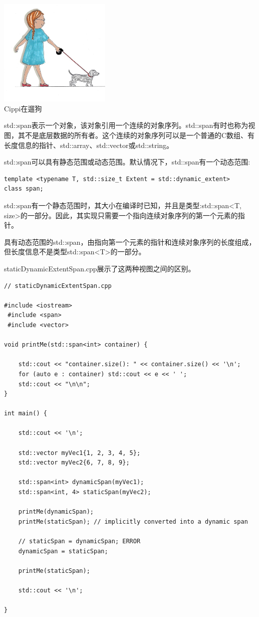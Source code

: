 \begin{center}
\includegraphics[width=0.4\textwidth]{content/3/chapter5/images/3.png}\\
Cippi在遛狗
\end{center}

std::span表示一个对象，该对象引用一个连续的对象序列。std::span有时也称为视图，其不是底层数据的所有者。这个连续的对象序列可以是一个普通的C数组、有长度信息的指针、std::array、std::vector或std::string。

std::span可以具有静态范围或动态范围。默认情况下，std::span有一个动态范围:

\begin{lstlisting}[style=styleCXX]
template <typename T, std::size_t Extent = std::dynamic_extent>
class span;
\end{lstlisting}


std::span有一个静态范围时，其大小在编译时已知，并且是类型:std::span<T, size>的一部分。因此，其实现只需要一个指向连续对象序列的第一个元素的指针。

具有动态范围的std::span，由指向第一个元素的指针和连续对象序列的长度组成，但长度信息不是类型std::span<T>的一部分。

staticDynamicExtentSpan.cpp展示了这两种视图之间的区别。

\begin{lstlisting}[style=styleCXX]
// staticDynamicExtentSpan.cpp

#include <iostream>
 #include <span>
 #include <vector>

void printMe(std::span<int> container) {
	
	std::cout << "container.size(): " << container.size() << '\n';
	for (auto e : container) std::cout << e << ' ';
	std::cout << "\n\n";
}

int main() {

	std::cout << '\n';
	
	std::vector myVec1{1, 2, 3, 4, 5};
	std::vector myVec2{6, 7, 8, 9};
	
	std::span<int> dynamicSpan(myVec1);
	std::span<int, 4> staticSpan(myVec2);
	
	printMe(dynamicSpan);
	printMe(staticSpan); // implicitly converted into a dynamic span
	
	// staticSpan = dynamicSpan; ERROR
	dynamicSpan = staticSpan;
	
	printMe(staticSpan);
	
	std::cout << '\n';

}
\end{lstlisting}


